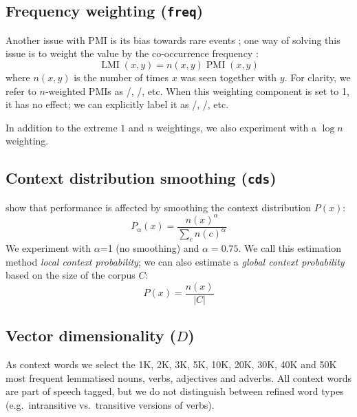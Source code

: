 \documentclass[11pt]{article}
\begin{document}
\subsection{Frequency weighting (\texttt{freq})}
\label{sec:frequency-weighting}

Another issue with PMI is its bias towards rare events \cite{TACL570}; one way of solving this issue is to weight the value by the co-occurrence frequency \cite{Evert05}:
%
\begin{equation}
  \label{eq:lmi}
  \operatorname{LMI}(x, y) = n(x, y)\operatorname{PMI}(x, y)
\end{equation}
%
where $n(x, y)$ is the number of times $x$ was seen together with $y$. For clarity, we refer to $n$-weighted PMIs as \NPMI/, \NSPMI/, etc. When this weighting component is set to 1, it has no effect; we can  explicitly label it as \PMI/, \SPMI/, etc.

In addition to the extreme $1$ and $n$ weightings, we also experiment with a $\log n$ weighting.

\subsection{Context distribution smoothing (\texttt{cds})}
\label{sec:cont-distr-smooth}

 show that performance is affected by smoothing the context distribution $P(x)$:
%
\begin{equation}
  \label{eq:cds}
  P_{\alpha}(x) = \frac{n(x)^{\alpha}}{\sum_{c}n(c)^{\alpha}}
\end{equation}
%
We experiment with $\alpha$=1 (no smoothing) and $\alpha = 0.75$. We call this estimation method \emph{local context probability}; we can also estimate a \emph{global context probability} based on the size of the corpus $C$:
%
\begin{equation}
  \label{eq:cds-nan}
  P(x) = \frac{n(x)}{|C|}
\end{equation}

\subsection{Vector dimensionality ($D$)}
\label{sec:vect-dimens}

As context words we select the 1K, 2K, 3K, 5K, 10K, 20K, 30K, 40K and 50K most frequent lemmatised nouns, verbs, adjectives and adverbs. All context words are part of speech tagged, but we do not distinguish between refined word types (e.g.~intransitive vs.~transitive versions of verbs).
\end{document}

